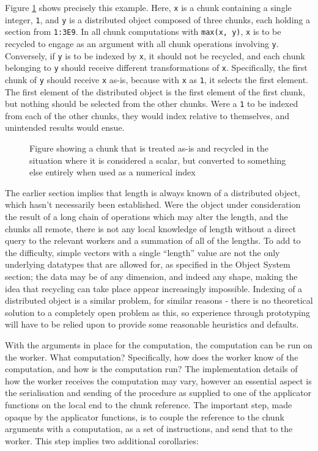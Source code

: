 Figure \ref{fig:chunk-recycle} shows precisely this example. Here, \texttt{x} is a
chunk containing a single integer, \texttt{1}, and \texttt{y} is a
distributed object composed of three chunks, each holding a section from
\texttt{1:3E9}. In all chunk computations with \texttt{max(x,\ y)},
\texttt{x} is to be recycled to engage as an argument with all chunk
operations involving \texttt{y}. Conversely, if \texttt{y} is to be
indexed by \texttt{x}, it should not be recycled, and each chunk
belonging to \texttt{y} should receive different transformations of
\texttt{x}. Specifically, the first chunk of \texttt{y} should receive
\texttt{x} as-is, because with \texttt{x} as \texttt{1}, it selects the
first element. The first element of the distributed object is the first
element of the first chunk, but nothing should be selected from the
other chunks. Were a \texttt{1} to be indexed from each of the other
chunks, they would index relative to themselves, and unintended results
would ensue.

\begin{figure}[ht]
    \centering
    
    \caption{Figure showing a chunk that is treated as-is and recycled in
        the situation where it is considered a scalar, but converted to
        something else entirely when used as a numerical index}
    \label{fig:chunk-recycle}
\end{figure}

The earlier section implies that length is always known of a distributed
object, which hasn't necessarily been established. Were the object under
consideration the result of a long chain of operations which may alter
the length, and the chunks all remote, there is not any local knowledge
of length without a direct query to the relevant workers and a summation
of all of the lengths. To add to the difficulty, simple vectors with a
single ``length'' value are not the only underlying datatypes that are
allowed for, as specified in the Object System section; the data may be
of any dimension, and indeed any shape, making the idea that recycling
can take place appear increasingly impossible. Indexing of a distributed
object is a similar problem, for similar reasons - there is no
theoretical solution to a completely open problem as this, so experience
through prototyping will have to be relied upon to provide some
reasonable heuristics and defaults.

With the arguments in place for the computation, the computation can be
run on the worker. What computation? Specifically, how does the worker
know of the computation, and how is the computation run? The
implementation details of how the worker receives the computation may
vary, however an essential aspect is the serialisation and sending of
the procedure as supplied to one of the applicator functions on the
local end to the chunk reference. The important step, made opaque by the
applicator functions, is to couple the reference to the chunk arguments
with a computation, as a set of instructions, and send that to the
worker. This step implies two additional corollaries:

